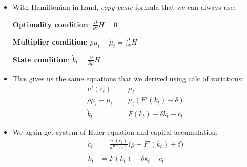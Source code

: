 \documentclass[10pt]{beamer}
\begin{document}
\begin{frame}{}
\begin{itemize}
\item With Hamiltonian in hand, \textit{copy-paste} formula that we can always use:

\vspace{1mm}
\textbf{Optimality condition}: $\frac{\partial}{\partial c} H = 0$

\vspace{2mm}
\textbf{Multiplier condition}: $\rho \mu_t - \dot \mu_t = \frac{\partial}{\partial k} H$

\vspace{2mm}
\textbf{State condition}: $\dot k_t = \frac{\partial}{\partial \mu} H$

\item This gives us the same equations that we derived using calc of variations:
\begin{align*}
	u'(c_t) &= \mu_t \\
	\rho \mu_t - \dot \mu_t &= \mu_t (F'(k_t) - \delta) \\
	\dot k_t &= F(k_t) - \delta k_t - c_t
\end{align*}

\item We again get system of Euler equation and capital accumulation:
\begin{align*}
	\dot c_t &= \frac{u'(c_t)}{u''(c_t)} \Big( \rho - F'(k_t) + \delta \Big) \\
	\dot k_t &= F(k_t) - \delta k_t - c_t
\end{align*}

\end{itemize}
\end{frame}
\end{document}
